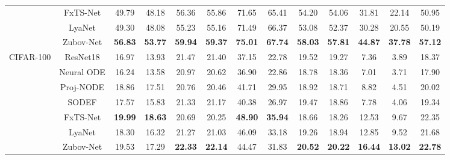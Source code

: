 \documentclass[journal]{IEEEtran}
\begin{document}
\begin{table}[ht]
\begin{tabular}{ccccccccccccc}
		& FxTS-Net             & 49.79          & 48.18          & 56.36          & 55.86          & 71.65          & 65.41          & 54.20          & 54.06          & 31.81          & 22.14          & 50.95                \\
		& LyaNet               & 49.30          & 48.08          & 55.23          & 55.16          & 71.49          & 66.37          & 53.08          & 52.37          & 30.28          & 20.55          & 50.19                \\
		& Zubov-Net            & \textbf{56.83} & \textbf{53.77} & \textbf{59.94} & \textbf{59.37} & \textbf{75.01} & \textbf{67.74} & \textbf{58.03} & \textbf{57.81} & \textbf{44.87} & \textbf{37.78} & \textbf{57.12}  \\ \midrule
		\multirow{6}{*}{CIFAR-100} & ResNet18             & 16.97           & 13.93           & 21.47            & 21.40           & 37.15          & 22.78           & 19.52           & 19.27           & 7.36             & 3.89             & 18.37                \\
		& Neural ODE           & 16.24           & 13.58           & 20.97           & 20.62          & 36.90           & 22.86           & 18.78           & 18.36           & 7.01             & 3.71             & 17.90                \\
		& Proj-NODE	           & 18.86 	         & 17.51 	       & 20.76 	         & 20.46 	      & 41.71 	       & 29.95 	         & 18.92 	       & 18.71 	         & 8.82 	        & 4.51 	           & 20.02 \\
		& SODEF                & 17.57           & 15.83           & 21.33           & 21.17          & 40.38          & 26.97           & 19.47           & 18.86           & 7.78             & 4.06             & 19.34                \\
		& FxTS-Net             & \textbf{19.99}  & \textbf{18.63}  & 20.69          & 20.25          & \textbf{48.90}  & \textbf{35.94}  & 18.66           & 18.26           & 12.53            & 9.67             & 22.35                \\
		& LyaNet               & 18.30            & 16.32           & 21.27           & 21.03          & 46.09          & 33.18           & 19.26           & 18.94           & 12.85            & 9.52             & 21.68                \\
		& Zubov-Net            & 19.53           & 17.29           & \textbf{22.33}  & \textbf{22.14} & 44.47          & 31.83           & \textbf{20.52}  & \textbf{20.22}  & \textbf{16.44}   & \textbf{13.02}   & \textbf{22.78}   \\ \midrule

\end{tabular}
\end{table}
\end{document}
